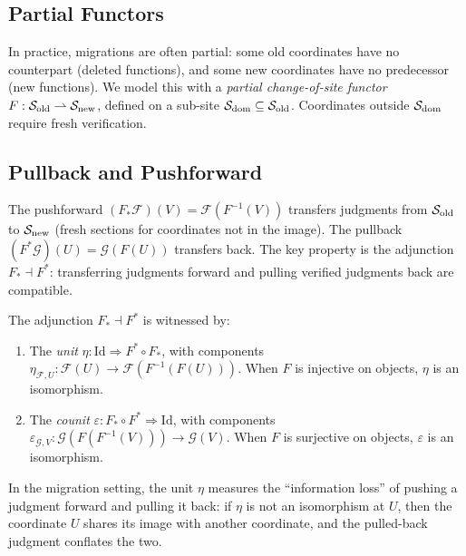 \documentclass[11pt]{article}
\newcommand{\SiteOld}{\Site_{\mathrm{old}}}
\newcommand{\SiteNew}{\Site_{\mathrm{new}}}
\newcommand{\FunctorF}{F}
\newcommand{\Pullback}{F^*}
\newcommand{\Pushforward}{F_*}
\begin{document}
\subsection{Partial Functors}
In practice, migrations are often partial: some old coordinates have no
counterpart (deleted functions), and some new coordinates have no predecessor
(new functions).  We model this with a \emph{partial change-of-site functor}
$\FunctorF : \SiteOld \rightharpoonup \SiteNew$, defined on a sub-site
$\Site_{\mathrm{dom}} \subseteq \SiteOld$.  Coordinates outside
$\mathcal{S}_{\mathrm{dom}}$ require fresh verification.

\subsection{Pullback and Pushforward}
The pushforward $(\Pushforward\mathcal{F})(V) = \mathcal{F}(\FunctorF^{-1}(V))$
transfers judgments from $\SiteOld$ to $\SiteNew$ (fresh sections for
coordinates not in the image).  The pullback
$(\Pullback\mathcal{G})(U) = \mathcal{G}(\FunctorF(U))$ transfers back.
The key property is the adjunction $\Pushforward \dashv \Pullback$: transferring
judgments forward and pulling verified judgments back are compatible.

\begin{lemma}\label{lem:adjunction-unit-counit}
The adjunction $\Pushforward \dashv \Pullback$ is witnessed by:
\begin{enumerate}[noitemsep]
  \item The \emph{unit} $\eta : \mathrm{Id} \Rightarrow \Pullback \circ
        \Pushforward$, with components
        $\eta_{\mathcal{F},U} : \mathcal{F}(U) \to
        \mathcal{F}(\FunctorF^{-1}(\FunctorF(U)))$.  When $\FunctorF$ is
        injective on objects, $\eta$ is an isomorphism.
  \item The \emph{counit} $\varepsilon : \Pushforward \circ \Pullback
        \Rightarrow \mathrm{Id}$, with components
        $\varepsilon_{\mathcal{G},V} : \mathcal{G}(\FunctorF(\FunctorF^{-1}(V)))
        \to \mathcal{G}(V)$.  When $\FunctorF$ is surjective on objects,
        $\varepsilon$ is an isomorphism.
\end{enumerate}
In the migration setting, the unit $\eta$ measures the ``information loss''
of pushing a judgment forward and pulling it back: if $\eta$ is not an
isomorphism at $U$, then the coordinate $U$ shares its image with another
coordinate, and the pulled-back judgment conflates the two.
\end{lemma}
\end{document}

